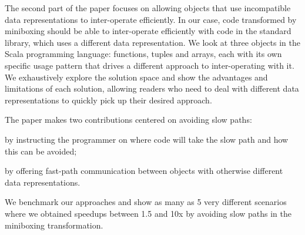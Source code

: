 The second part of the paper focuses on allowing objects that use incompatible data representations to inter-operate efficiently. In our case, code transformed by miniboxing should be able to inter-operate efficiently with code in the standard library, which uses a different data representation. We look at three objects in the Scala programming language: functions, tuples and arrays, each with its own specific usage pattern that drives a different approach to inter-operating with it. We exhaustively explore the solution space and show the advantages and limitations of each solution, allowing readers who need to deal with different data representations to quickly pick up their desired approach.

The paper makes two contributions centered on avoiding slow paths:
\begin{compactitem}
  \item by instructing the programmer on where code will take the slow path and how this can be avoided;
  \item by offering fast-path communication between objects with otherwise different data representations.
\end{compactitem}

We benchmark our approaches and show as many as 5 very different scenarios where we obtained speedups between 1.5 and 10x by avoiding slow paths in the miniboxing transformation.
